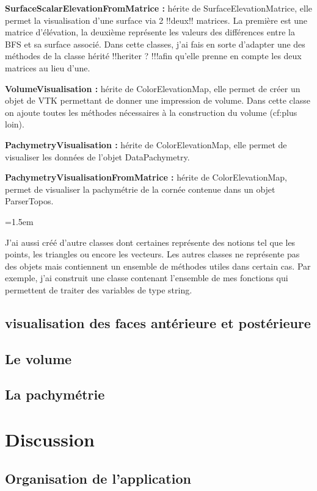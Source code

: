 \documentclass[a4paper,12pt]{article}
\begin{document}
\textbf{SurfaceScalarElevationFromMatrice : }
hérite de SurfaceElevationMatrice, elle permet la visualisation d'une surface via 2 !!deux!! matrices. La première est une matrice d'élévation, la deuxième représente les valeurs des différences entre la BFS et sa surface associé. Dans cette classes, j'ai fais en sorte d'adapter une des méthodes de la classe hérité !!heriter ? !!!afin qu'elle prenne en compte les deux matrices au lieu d'une.

\textbf{VolumeVisualisation : }
hérite de ColorElevationMap, elle permet de créer un objet de VTK permettant de donner une impression de volume. Dans cette classe on ajoute toutes les méthodes nécessaires à la construction du volume (cf:plus loin).

\textbf{PachymetryVisualisation : }
hérite de ColorElevationMap, elle permet de visualiser les données de l'objet DataPachymetry.

\textbf{PachymetryVisualisationFromMatrice : }
hérite de ColorElevationMap, permet de visualiser la pachymétrie de la cornée contenue dans un objet ParserTopos.

\vspace{0.25cm}
\parindent=1.5em

 J'ai aussi créé d'autre classes dont certaines représente des notions tel que les points, les triangles ou encore les vecteurs. Les autres classes ne représente pas des objets mais contiennent un ensemble de méthodes utiles dans certain cas. Par exemple, j'ai construit une classe contenant l'ensemble de mes fonctions qui permettent de traiter des variables de type string.
	\subsection{visualisation des faces antérieure et postérieure}
	
	\subsection{Le volume}

	\subsection{La pachymétrie}


\newpage
\section{Discussion}
	\subsection{Organisation de l'application}
\end{document}
